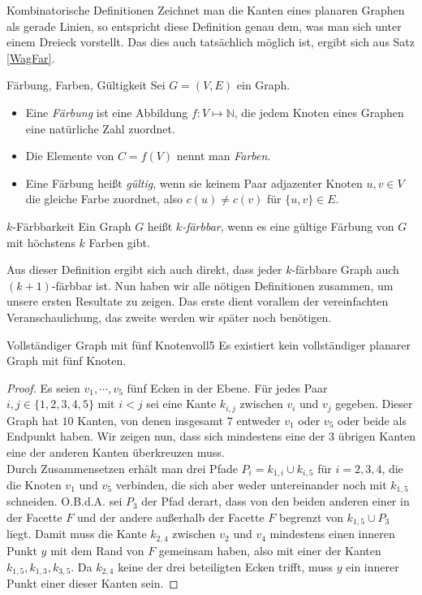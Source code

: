 \begin{section}{Kombinatorische Definitionen}
  Zeichnet man die Kanten eines planaren Graphen als gerade Linien, so entspricht diese Definition genau dem, was man sich unter einem Dreieck vorstellt. Das dies auch tatsächlich möglich ist, ergibt sich aus Satz \ref{WagFar}. 
 
  \begin{definition}{Färbung, Farben, Gültigkeit}
   Sei $G=(V,E)$ ein Graph.
   \begin{itemize}
   \item Eine \textit{Färbung} ist eine Abbildung $f: V \mapsto \mathbb{N}$, die jedem Knoten eines Graphen eine natürliche Zahl zuordnet. 
   \item Die Elemente von $C  =f(V)$ nennt man \textit{Farben}. 
   \item Eine Färbung heißt \textit{gültig}, wenn sie keinem Paar adjazenter Knoten $u,v \in V$ die gleiche Farbe zuordnet, also $c(u) \neq c(v)$ für $\{u,v\}\in E$. 
   \end{itemize}
  \end{definition}
  
  \begin{definition}{$k$-Färbbarkeit}
   Ein Graph $G$ heißt \textit{$k$-färbbar}, wenn es eine gültige Färbung von $G$ mit höchstens $k$ Farben gibt.
  \end{definition}
  
  Aus dieser Definition ergibt sich auch direkt, dass jeder $k$-färbbare Graph auch $(k+1)$-färbbar ist. Nun haben wir alle nötigen Definitionen zusammen, um unsere ersten Resultate zu zeigen. Das erste dient vorallem der vereinfachten Veranschaulichung, das zweite werden wir später noch benötigen.
  
  \begin{satzl}{Vollständiger Graph mit fünf Knoten}{voll5}
   Es existiert kein vollständiger planarer Graph mit fünf Knoten.
  \end{satzl}
  \begin{proof}
    Es seien $v_1,\cdots,v_5$ fünf Ecken in der Ebene. Für jedes Paar $i,j \in \{1,2,3,4,5\}$ mit $i < j$ sei eine Kante $k_{i,j}$ zwischen $v_i$ und $v_j$ gegeben. Dieser Graph hat $10$ Kanten, von denen insgesamt $7$ entweder $v_1$ oder $v_5$ oder beide als Endpunkt haben. Wir zeigen nun, dass sich mindestens eine der $3$ übrigen Kanten eine der anderen Kanten überkreuzen muss.\\
    Durch Zusammensetzen erhält man drei Pfade $P_i = k_{1,i} \cup k_{i,5}$ für $i = 2,3,4$, die die Knoten $v_1$ und $v_5$ verbinden, die sich aber weder untereinander noch mit $k_{1,5}$ schneiden. O.B.d.A. sei $P_3$ der Pfad derart, dass von den beiden anderen einer in der Facette $F$ und der andere außerhalb der Facette $F$ begrenzt von $k_{1,5} \cup P_3$ liegt. Damit muss die Kante $k_{2,4}$ zwischen $v_2$ und $v_4$ mindestens einen inneren Punkt $y$ mit dem Rand von $F$ gemeinsam haben, also mit einer der Kanten $k_{1,5},k_{1,3},k_{3,5}$. Da $k_{2,4}$ keine der drei beteiligten Ecken trifft, muss $y$ ein innerer Punkt einer dieser Kanten sein.
  \end{proof}
  

\end{section}
